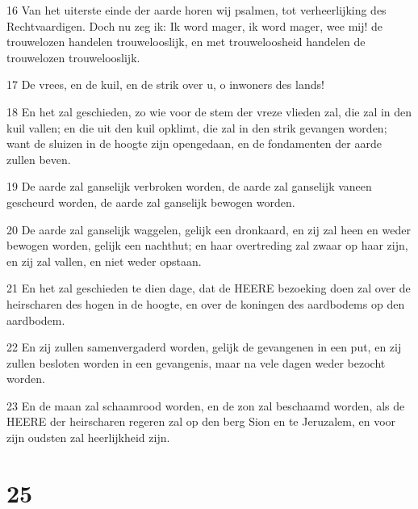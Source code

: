 \par 16 Van het uiterste einde der aarde horen wij psalmen, tot verheerlijking des Rechtvaardigen. Doch nu zeg ik: Ik word mager, ik word mager, wee mij! de trouwelozen handelen trouwelooslijk, en met trouweloosheid handelen de trouwelozen trouwelooslijk.
\par 17 De vrees, en de kuil, en de strik over u, o inwoners des lands!
\par 18 En het zal geschieden, zo wie voor de stem der vreze vlieden zal, die zal in den kuil vallen; en die uit den kuil opklimt, die zal in den strik gevangen worden; want de sluizen in de hoogte zijn opengedaan, en de fondamenten der aarde zullen beven.
\par 19 De aarde zal ganselijk verbroken worden, de aarde zal ganselijk vaneen gescheurd worden, de aarde zal ganselijk bewogen worden.
\par 20 De aarde zal ganselijk waggelen, gelijk een dronkaard, en zij zal heen en weder bewogen worden, gelijk een nachthut; en haar overtreding zal zwaar op haar zijn, en zij zal vallen, en niet weder opstaan.
\par 21 En het zal geschieden te dien dage, dat de HEERE bezoeking doen zal over de heirscharen des hogen in de hoogte, en over de koningen des aardbodems op den aardbodem.
\par 22 En zij zullen samenvergaderd worden, gelijk de gevangenen in een put, en zij zullen besloten worden in een gevangenis, maar na vele dagen weder bezocht worden.
\par 23 En de maan zal schaamrood worden, en de zon zal beschaamd worden, als de HEERE der heirscharen regeren zal op den berg Sion en te Jeruzalem, en voor zijn oudsten zal heerlijkheid zijn.

\chapter{25}

